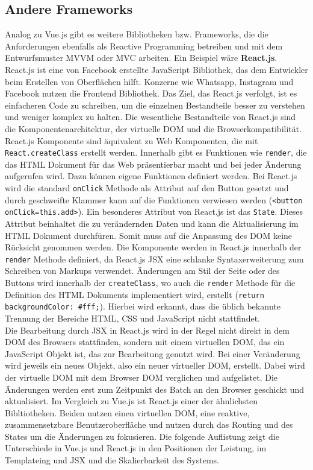 \subsection{Andere Frameworks}
Analog zu Vue.js gibt es weitere Bibliotheken bzw. Frameworks, die die Anforderungen ebenfalls als Reactive Programming betreiben und mit dem Entwurfsmuster \ac{MVVM} oder \ac{MVC} arbeiten. Ein Beispiel w\"are \textbf{React.js}.
React.js ist eine von Facebook erstellte JavaScript Bibliothek, das dem Entwickler beim Erstellen von Oberfl\"achen hilft. Konzerne wie Whatsapp, Instagram und Facebook nutzen die Frontend Bibliothek. Das Ziel, das React.js verfolgt, ist es einfacheren Code zu schreiben, um die einzelnen Bestandteile besser zu verstehen und weniger komplex zu halten. Die wesentliche Bestandteile von React.js sind die Komponentenarchitektur, der virtuelle \ac{DOM} und die Browserkompatibilit\"at.\\
React.js Komponente sind \"aquivalent zu Web Komponenten, die mit \texttt{React.createClass} erstellt werden. Innerhalb gibt es Funktionen wie \texttt{render}, die das \ac{HTML} Dokument f\"ur das Web pr\"asentierbar macht und bei jeder \"Anderung aufgerufen wird. Dazu k\"onnen eigene Funktionen definiert werden. Bei React.js wird die standard \texttt{onClick} Methode als Attribut auf den Button gesetzt und durch geschweifte Klammer kann auf die Funktionen verwiesen werden (\texttt{<button onClick={this.add}>}). Ein besonderes Attribut von React.js ist das \texttt{State}. Dieses Attribut beinhaltet die zu ver\"andernden Daten und kann die Aktualisierung im \ac{HTML} Dokument durchf\"uren. Somit muss auf die Anpassung des \ac{DOM} keine R\"ucksicht genommen werden. Die Komponente werden in React.js innerhalb der \texttt{render} Methode definiert, da React.js JSX eine schlanke Syntaxerweiterung zum Schreiben von Markups verwendet. \"Anderungen am Stil der Seite oder des Buttons wird innerhalb der \texttt{createClass}, wo auch die \texttt{render} Methode f\"ur die Definition des \ac{HTML} Dokuments implementiert wird, erstellt (\texttt{return {backgroundColor: \#fff};}). Hierbei wird erkannt, dass die \"ublich bekannte Trennung der Bereiche \ac{HTML}, \ac{CSS} und JavaScript nicht stattfindet\cite{Kogel2015}. \\
Die Bearbeitung durch JSX in React.js wird in der Regel nicht direkt in dem \ac{DOM} des Browsers stattfinden, sondern mit einem virtuellen \ac{DOM}, das ein JavaScript Objekt ist, das zur Bearbeitung genutzt wird. Bei einer Ver\"anderung wird jeweils ein neues Objekt, also ein neuer virtueller \ac{DOM}, erstellt. Dabei wird der virtuelle \ac{DOM} mit dem Browser \ac{DOM} verglichen und aufgelistet. Die \"Anderungen werden erst zum Zeitpunkt des Batch an den Browser geschickt und aktualisiert\cite{Skirzynski2015}. Im Vergleich zu Vue.js ist React.js einer der \"ahnlichsten Bibltiotheken. Beiden nutzen einen virtuellen \ac{DOM}, eine reaktive, zusammensetzbare Benutzeroberfl\"ache und nutzen durch das Routing und des States um die \"Anderungen zu fokusieren. Die folgende Auflistung zeigt die Unterschiede in Vue.js und React.js in den Positionen der Leistung, im Templateing und JSX und die Skalierbarkeit des Systems.
